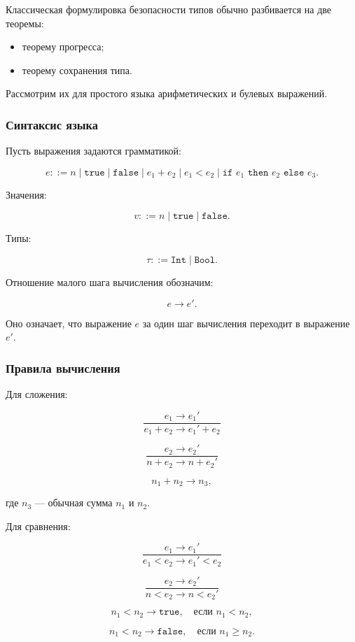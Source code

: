 \documentclass[12pt,a4paper]{article}
\begin{document}
Классическая формулировка безопасности типов обычно разбивается на две теоремы:

\begin{itemize}
    \item теорему прогресса;
    \item теорему сохранения типа.
\end{itemize}

Рассмотрим их для простого языка арифметических и булевых выражений.

\subsubsection{Синтаксис языка}

Пусть выражения задаются грамматикой:

\[
e ::= n
\mid \texttt{true}
\mid \texttt{false}
\mid e_1 + e_2
\mid e_1 < e_2
\mid \texttt{if } e_1 \texttt{ then } e_2 \texttt{ else } e_3.
\]

Значения:

\[
v ::= n \mid \texttt{true} \mid \texttt{false}.
\]

Типы:

\[
\tau ::= \texttt{Int} \mid \texttt{Bool}.
\]

Отношение малого шага вычисления обозначим:

\[
e \to e'.
\]

Оно означает, что выражение \(e\) за один шаг вычисления переходит в выражение \(e'\).

\subsubsection{Правила вычисления}

Для сложения:

\[
\frac{e_1 \to e_1'}{e_1 + e_2 \to e_1' + e_2}
\]

\[
\frac{e_2 \to e_2'}{n + e_2 \to n + e_2'}
\]

\[
n_1 + n_2 \to n_3,
\]

где \(n_3\) --- обычная сумма \(n_1\) и \(n_2\).

Для сравнения:

\[
\frac{e_1 \to e_1'}{e_1 < e_2 \to e_1' < e_2}
\]

\[
\frac{e_2 \to e_2'}{n < e_2 \to n < e_2'}
\]

\[
n_1 < n_2 \to \texttt{true},
\quad \text{если } n_1 < n_2,
\]

\[
n_1 < n_2 \to \texttt{false},
\quad \text{если } n_1 \ge n_2.
\]
\end{document}
